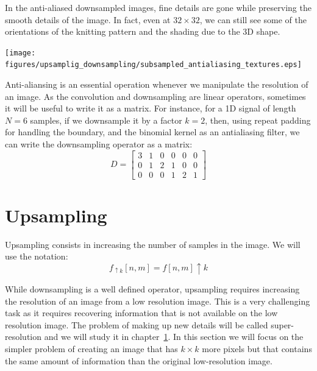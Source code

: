 In the anti-aliased downsampled images, fine details are gone while preserving the smooth details of the image. In fact, even at $32 \times 32$, we can still see some of the orientations of the knitting pattern and the shading due to the 3D shape.

\begin{center}
\texttt{[image: figures/upsamplig\_downsampling/subsampled\_antialiasing\_textures.eps]}
\end{center}

Anti-aliansing is an essential operation whenever we manipulate the resolution of an image. 
As the convolution and downsampling are linear operators, sometimes it will be useful to write it as a matrix. For instance, for a 1D signal of length $N=6$  samples, if we downsample it by a factor $k=2$, then, using repeat padding for handling the boundary, and the binomial kernel as an antialiasing filter, we can write the downsampling operator as a matrix:
\begin{equation}
D = \left[ 
\begin{array}{cccccc}
3 & 1 & 0 & 0 & 0 & 0\\
0 & 1 & 2 & 1 & 0 & 0 \\
0 & 0 & 0 & 1 & 2 & 1  
\end{array}
\right]
\end{equation}



\section{Upsampling}

Upsampling consists in increasing the number of samples in the image. We will use the notation:
\begin{equation}
f_{\uparrow k} \left[n,m\right]  = f\left[n,m\right] \uparrow k 
\end{equation}

While downsampling is a well defined operator, upsampling requires increasing the resolution of an image from a low resolution image. This is a very challenging task as it requires recovering information that is not available on the low resolution image. The problem of making up new details will be called super-resolution and we will study it in chapter~\ref{}.  In this section we will focus on the simpler problem of creating an image that has $k \times k$ more pixels but that contains the same amount of information than the original low-resolution image. 

